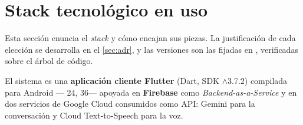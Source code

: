 
\section{Stack tecnológico en uso}
\label{sec:stack}

Esta sección enuncia el \emph{stack} y cómo encajan sus piezas. La justificación de cada elección se
desarrolla en el \autoref{sec:adr}, y las versiones son las fijadas en , verificadas
sobre el árbol de código.

El sistema es una \textbf{aplicación cliente Flutter} (Dart, SDK $\wedge$3.7.2) compilada para Android
--- 24,  36--- apoyada en \textbf{Firebase} como \emph{Backend-as-a-Service}
y en dos servicios de Google Cloud consumidos como API: Gemini para la conversación y Cloud
Text-to-Speech para la voz.

